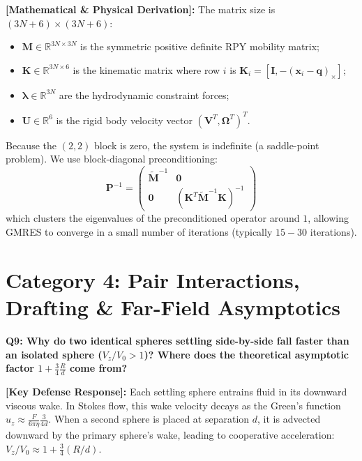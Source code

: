 \documentclass[11pt,a4paper]{article}
\newcommand{\question}[2]{
    \vspace{0.4cm}
    \noindent\colorbox{blue!10}{\parbox{\dimexpr\textwidth-2\fboxsep\relax}{
        \textbf{#1: #2}
    }}
    \vspace{0.2cm}
}
\newcommand{\shortanswer}[1]{
    \noindent\textbf{\textcolor{green!50!black}{[Key Defense Response]:}} #1
    \vspace{0.2cm}
}
\newcommand{\deepdetails}[1]{
    \noindent\textbf{\textcolor{blue!60!black}{[Mathematical \& Physical Derivation]:}} #1
    \vspace{0.2cm}
}
\begin{document}
\deepdetails{
The matrix size is $(3N + 6) \times (3N + 6)$:
\begin{itemize}
    \item $\mathbf{M} \in \mathbb{R}^{3N \times 3N}$ is the symmetric positive definite RPY mobility matrix;
    \item $\mathbf{K} \in \mathbb{R}^{3N \times 6}$ is the kinematic matrix where row $i$ is $\mathbf{K}_i = [\mathbf{I}, -(\mathbf{x}_i - \mathbf{q})_\times]$;
    \item $\boldsymbol{\lambda} \in \mathbb{R}^{3N}$ are the hydrodynamic constraint forces;
    \item $\mathbf{U} \in \mathbb{R}^6$ is the rigid body velocity vector $(\mathbf{V}^T, \mathbf{\Omega}^T)^T$.
\end{itemize}
Because the $(2,2)$ block is zero, the system is indefinite (a saddle-point problem). We use block-diagonal preconditioning:
\begin{equation}
    \mathbf{P}^{-1} = \begin{pmatrix} \tilde{\mathbf{M}}^{-1} & \mathbf{0} \\ \mathbf{0} & (\mathbf{K}^T \tilde{\mathbf{M}}^{-1} \mathbf{K})^{-1} \end{pmatrix}
\end{equation}
which clusters the eigenvalues of the preconditioned operator around $1$, allowing GMRES to converge in a small number of iterations (typically $15 - 30$ iterations).
}

\section{Category 4: Pair Interactions, Drafting \& Far-Field Asymptotics}

\question{Q9}{Why do two identical spheres settling side-by-side fall faster than an isolated sphere ($V_z / V_0 > 1$)? Where does the theoretical asymptotic factor $1 + \frac{3}{4}\frac{R}{d}$ come from?}

\shortanswer{Each settling sphere entrains fluid in its downward viscous wake. In Stokes flow, this wake velocity decays as the Green's function $u_z \approx \frac{F}{6\pi\eta} \frac{3}{4d}$. When a second sphere is placed at separation $d$, it is advected downward by the primary sphere's wake, leading to cooperative acceleration: $V_z / V_0 \approx 1 + \frac{3}{4}(R/d)$.}
\end{document}
